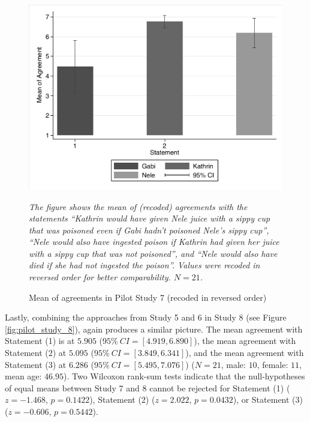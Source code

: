 \documentclass[egregdoesnotlikesansseriftitles,12pt]{scrartcl}
\begin{document}
\begin{figure}[H]
   \centering
   \includegraphics[scale=0.8]{figures/pilot_study_7.pdf}
   \begin{minipage}{0.9\linewidth}
   \footnotesize
   \emph{The figure shows the mean of (recoded) agreements with the statements ``Kathrin would have given Nele juice with a sippy cup that was poisoned even if Gabi hadn't poisoned Nele's sippy cup'', ``Nele would also have ingested poison if Kathrin had given her juice with a sippy cup that was not poisoned'', and ``Nele would also have died if she had not ingested the poison''. Values were recoded in reversed order for better comparability. $N=21$.}
   \end{minipage}
   \caption{Mean of agreements in Pilot Study 7 (recoded in reversed order)}
   \label{fig:pilot_study_7}
\end{figure}

\noindent Lastly, combining the approaches from Study 5 and 6 in Study 8 (see Figure \ref{fig:pilot_study_8}), again produces a similar picture. The mean agreement with Statement (1) is at $5.905$ ($95\%~CI=[4.919,6.890]$), the mean agreement with Statement (2) at $5.095$ ($95\%~CI=[3.849,6.341]$), and the mean agreement with Statement (3) at $6.286$ ($95\%~CI=[5.495,7.076]$) ($N=21$, male: $10$, female: $11$, mean age: $46.95$). Two Wilcoxon rank-sum tests indicate that the null-hypotheses of equal means between Study 7 and 8 cannot be rejected for Statement (1) ($z=-1.468$, $p=0.1422$), Statement (2) ($z=2.022$, $p=0.0432$), or Statement (3) ($z=-0.606$, $p=0.5442$).
\end{document}

